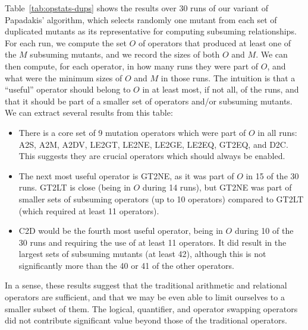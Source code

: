 Table~\ref{tab:opstats-dups} shows the results over 30 runs of our variant of Papadakis' algorithm, which selects randomly one mutant from each set of duplicated mutants as its representative for computing subsuming relationships.
For each run, we compute the set $O$ of operators that produced at least one of the $M$ subsuming mutants, and we record the sizes of both $O$ and $M$.
We can then compute, for each operator, in how many runs they were part of $O$, and what were the minimum sizes of $O$ and $M$ in those runs.
The intuition is that a ``useful'' operator should belong to $O$ in at least most, if not all, of the runs, and that it should be part of a smaller set of operators and/or subsuming mutants.
We can extract several results from this table:

\begin{itemize}
\item There is a core set of 9 mutation operators which were part of $O$ in all runs: A2S, A2M, A2DV, LE2GT, LE2NE, LE2GE, LE2EQ, GT2EQ, and D2C. This suggests they are crucial operators which should always be enabled.

\item The next most useful operator is GT2NE, as it was part of $O$ in 15 of the 30 runs. GT2LT is close (being in $O$ during 14 runs), but GT2NE was part of smaller sets of subsuming operators (up to 10 operators) compared to GT2LT (which required at least 11 operators).

\item C2D would be the fourth most useful operator, being in $O$ during 10 of the 30 runs and requiring the use of at least 11 operators. It did result in the largest sets of subsuming mutants (at least 42), although this is not significantly more than the 40 or 41 of the other operators.
\end{itemize}

In a sense, these results suggest that the traditional arithmetic and relational operators are sufficient, and that we may be even able to limit ourselves to a smaller subset of them.
The logical, quantifier, and operator swapping operators did not contribute significant value beyond those of the traditional operators.

